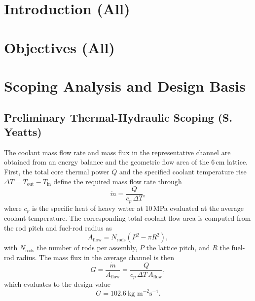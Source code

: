 \documentclass[12pt]{article}
\numberwithin{equation}{section}
\begin{document}
\clearpage
\tableofcontents

\clearpage
\pagestyle{fancy}

\section{Introduction (All)}


\clearpage
\section{Objectives (All)}


\clearpage
\section{Scoping Analysis and Design Basis }
\label{sec:scoping-section}


\subsection{Preliminary Thermal-Hydraulic Scoping (S. Yeatts)}
\label{sec:th-scoping}
The coolant mass flow rate and mass flux in the representative channel are obtained from an energy balance and the geometric flow area of the 6\,cm lattice. First, the total core thermal power $Q$ and the specified coolant temperature rise $\Delta T = T_{\text{out}} - T_{\text{in}}$ define the required mass flow rate through
\[
\dot{m} = \frac{Q}{c_p \,\Delta T},
\]
where $c_p$ is the specific heat of heavy water at 10\,MPa evaluated at the average coolant temperature. The corresponding total coolant flow area is computed from the rod pitch and fuel-rod radius as
\[
A_{\text{flow}} = N_{\text{rods}}\left(P^{2} - \pi R^{2}\right),
\]
with $N_{\text{rods}}$ the number of rods per assembly, $P$ the lattice pitch, and $R$ the fuel-rod radius. The mass flux in the average channel is then
\[
G = \frac{\dot{m}}{A_{\text{flow}}}
= \frac{Q}{c_p \,\Delta T \, A_{\text{flow}}},
\]
which evaluates to the design value
\[
G = 102.6~\text{kg m}^{-2}\text{s}^{-1}.
\]
\end{document}
